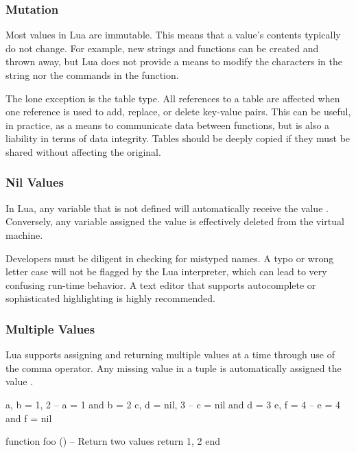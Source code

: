 \subsubsection{Mutation}
\label{sec:DataMutation}

Most values in Lua are immutable.  This means that a value's contents typically
do not change.  For example, new strings and functions can be created and
thrown away, but Lua does not provide a means to modify the characters in the
string nor the commands in the function.

The lone exception is the table type.  All references to a table are affected
when one reference is used to add, replace, or delete key-value pairs.  This
can be useful, in practice, as a means to communicate data between functions,
but is also a liability in terms of data integrity.  Tables should be deeply
copied if they must be shared without affecting the original.

\subsubsection{Nil Values}

In Lua, any variable that is not defined will automatically receive the value
.  Conversely, any variable assigned the value  is
effectively deleted from the virtual machine.

Developers must be diligent in checking for mistyped names.  A typo or wrong
letter case will not be flagged by the Lua interpreter, which can lead to very
confusing run-time behavior.  A text editor that supports autocomplete or
sophisticated highlighting is highly recommended.

\subsubsection{Multiple Values}

Lua supports assigning and returning multiple values at a time through use of
the comma operator.  Any missing value in a tuple is automatically assigned the
value .

\begin{LuaCode}
a, b = 1, 2   -- a = 1 and b = 2
c, d = nil, 3 -- c = nil and d = 3
e, f = 4      -- e = 4 and f = nil
\end{LuaCode}

\begin{LuaCode}
function foo ()
	-- Return two values
	return 1, 2
end
\end{LuaCode}

